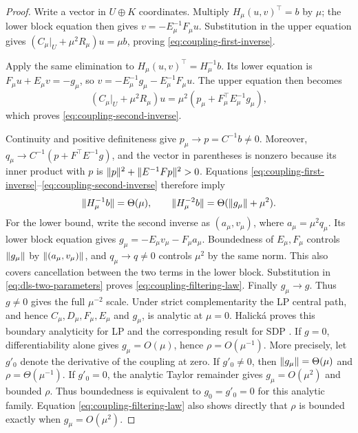 \begin{proof}
Write a vector in $U\oplus K$ coordinates.  Multiply
$H_\mu(u,v)^\top=b$ by $\mu$; the lower block equation then gives
$v=-E_\mu^{-1}F_\mu u$.  Substitution in the upper equation gives
$(C_\mu|_U+\mu^2R_\mu)u=\mu b$, proving
\eqref{eq:coupling-first-inverse}.

Apply the same elimination to
$H_\mu(u,v)^\top=H_\mu^{-1}b$.  Its lower equation is
$F_\mu u+E_\mu v=-g_\mu$, so
$v=-E_\mu^{-1}g_\mu-E_\mu^{-1}F_\mu u$.  The upper equation then becomes
\[
 (C_\mu|_U+\mu^2R_\mu)u
 =\mu^2(p_\mu+F_\mu^\top E_\mu^{-1}g_\mu),
\]
which proves \eqref{eq:coupling-second-inverse}.

Continuity and positive definiteness give
$p_\mu\to p=C^{-1}b\ne0$.  Moreover,
$q_\mu\to C^{-1}(p+F^\top E^{-1}g)$, and the vector in parentheses is
nonzero because its inner product with $p$ is
$\lVert p\rVert^2+\lVert E^{-1}Fp\rVert^2>0$.  Equations
\eqref{eq:coupling-first-inverse}--\eqref{eq:coupling-second-inverse}
therefore imply
\[
 \lVert H_\mu^{-1}b\rVert=\Theta(\mu),\qquad
 \lVert H_\mu^{-2}b\rVert=\Theta(\lVert g_\mu\rVert+\mu^2).
\]
For the lower bound, write the second inverse as $(a_\mu,v_\mu)$,
where $a_\mu=\mu^2q_\mu$. Its lower block equation gives
$g_\mu=-E_\mu v_\mu-F_\mu a_\mu$. Boundedness of $E_\mu,F_\mu$
controls $\lVert g_\mu\rVert$ by $\lVert(a_\mu,v_\mu)\rVert$, and
$q_\mu\to q\ne0$ controls $\mu^2$ by the same norm. This also covers
cancellation between the two terms in the lower block.
Substitution in \eqref{eq:dls-two-parameters} proves
\eqref{eq:coupling-filtering-law}.  Finally $g_\mu\to g$.  Thus $g\ne0$
gives the full $\mu^{-2}$ scale.  Under strict complementarity the LP
central path, and hence $C_\mu,D_\mu,F_\mu,E_\mu$ and $g_\mu$, is analytic
at $\mu=0$.  Halick\'a proves this boundary analyticity for LP and the
corresponding result for SDP
\cite{halicka1999-analytical-properties-central-path-linear-programming,
halicka2002-analyticity-of-the-central-path}. If $g=0$, differentiability
alone gives $g_\mu=O(\mu)$, hence $\rho=O(\mu^{-1})$. More precisely,
let $g'_0$ denote the derivative of the coupling at zero. If $g'_0\ne0$,
then $\lVert g_\mu\rVert=\Theta(\mu)$ and $\rho=\Theta(\mu^{-1})$.
If $g'_0=0$, the analytic Taylor remainder gives $g_\mu=O(\mu^2)$
and bounded $\rho$. Thus boundedness is equivalent to $g_0=g'_0=0$
for this analytic family. Equation \eqref{eq:coupling-filtering-law} also
shows directly that $\rho$ is bounded exactly when $g_\mu=O(\mu^2)$.
\end{proof}


